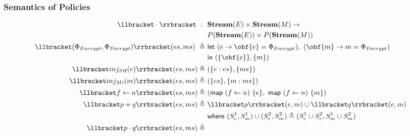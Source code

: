 \documentclass[sigconf,usenames,dvipsnames,svgnames,table]{acmart}
\begin{document}
      \subsubsection{Semantics of Policies}\label{sec:spec:sem:pol}
        \begin{figure}
          \centering
          \begin{align*} 
            \interp { \cdot }\ 
              :\ \ &
              \mathbf{Stream}(E)\times \mathbf{Stream}(M) \rightarrow \\
              & P(\mathbf{Stream}(E))\times P(\mathbf{Stream}(M)) 
              \\
            \interp {(\Phi_{Encrypt}, \Phi_{Decrypt})}(es, ms)\
              \triangleq\
              & \mathsf{let}\ (e \rightarrow \obf{e} = \Phi_{Encrypt}),
                            \ (\obf{m} \rightarrow m = \Phi_{Decrypt})\\
              & \mathsf{in}\
              (\{\obf{e}\}, \{m\})
              \\
            \interp { inj_{SR}(e) }(es, ms)
              \triangleq\ &
              (\{e : es\}, \{ms\}) 
              \\
            \interp { inj_{Mi}(m) }(es, ms)
              \triangleq\ &
              (\{es\},\{m : ms\})
              \\
            \interp { f \leftarrow n }(es, ms)
              \triangleq\ &
              (\mathsf{map}\ (f\leftarrow n)\ \{e\},\
               \mathsf{map}\ (f\leftarrow n)\ \{m\})
              \\ %
            \interp { p + q }(es, ms)
              \triangleq\ &
              \interp { p }(e, m)\cup
              \interp { q }(e, m) \\
              &\mathsf{where}\ (S_e^1, S_m^1)\cup (S_e^2, S_m^2)\triangleq
                (S_e^1\cup S_e^2, S_m^1\cup S_m^2)\\
            \interp { p \cdot q }(es, ms)
              \triangleq\ &

\end{align*}
\end{figure}
\end{document}
